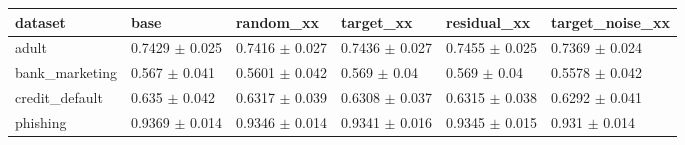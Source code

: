 \begin{tabular}{llllll}
\toprule
dataset & base & random\_xx & target\_xx & residual\_xx & target\_noise\_xx \\
\midrule
adult & 0.7429 $\pm$ 0.025 & 0.7416 $\pm$ 0.027 & 0.7436 $\pm$ 0.027 & 0.7455 $\pm$ 0.025 & 0.7369 $\pm$ 0.024 \\
bank\_marketing & 0.567 $\pm$ 0.041 & 0.5601 $\pm$ 0.042 & 0.569 $\pm$ 0.04 & 0.569 $\pm$ 0.04 & 0.5578 $\pm$ 0.042 \\
credit\_default & 0.635 $\pm$ 0.042 & 0.6317 $\pm$ 0.039 & 0.6308 $\pm$ 0.037 & 0.6315 $\pm$ 0.038 & 0.6292 $\pm$ 0.041 \\
phishing & 0.9369 $\pm$ 0.014 & 0.9346 $\pm$ 0.014 & 0.9341 $\pm$ 0.016 & 0.9345 $\pm$ 0.015 & 0.931 $\pm$ 0.014 \\
\bottomrule
\end{tabular}
